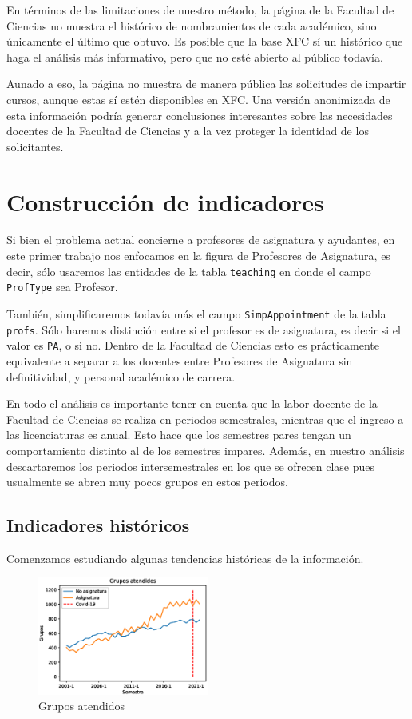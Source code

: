 \documentclass[twocolumn]{article}
\theoremstyle{definition}
\begin{document}
En términos de las limitaciones de nuestro método, la página de la Facultad de Ciencias no muestra el histórico de nombramientos de cada académico, sino únicamente el último que obtuvo. Es posible que la base XFC sí un histórico que haga el análisis más informativo, pero que no esté abierto al público todavía.

Aunado a eso, la página no muestra de manera pública las solicitudes de impartir cursos, aunque estas sí estén disponibles en XFC. Una versión anonimizada de esta información podría generar conclusiones interesantes sobre las necesidades docentes de la Facultad de Ciencias y a la vez proteger la identidad de los solicitantes.

\section{Construcción de indicadores}

Si bien el problema actual concierne a profesores de asignatura y ayudantes, en este primer trabajo nos enfocamos en la figura de Profesores de Asignatura, es decir, sólo usaremos las entidades de la tabla \texttt{teaching} en donde el campo \texttt{ProfType} sea Profesor.

También, simplificaremos todavía más el campo \texttt{SimpAppointment} de la tabla \texttt{profs}. Sólo haremos distinción entre si el profesor es de asignatura, es decir si el valor es \texttt{PA}, o si no. Dentro de la Facultad de Ciencias esto es prácticamente equivalente a separar a los docentes entre Profesores de Asignatura sin definitividad, y personal académico de carrera.

En todo el análisis es importante tener en cuenta que la labor docente de la Facultad de Ciencias se realiza en periodos semestrales, mientras que el ingreso a las licenciaturas es anual. Esto hace que los semestres pares tengan un comportamiento distinto al de los semestres impares. Además, en nuestro análisis descartaremos los periodos intersemestrales en los que se ofrecen clase pues usualmente se abren muy pocos grupos en estos periodos.

\subsection{Indicadores históricos}

Comenzamos estudiando algunas tendencias históricas de la información.

\begin{figure}
    \centering
    \includegraphics[width=0.5\textwidth]{fig/grupos.eps}
    \caption{Grupos atendidos}
    \label{fig:groups}
\end{figure}
\end{document}
